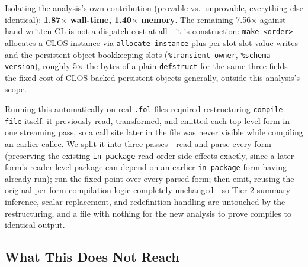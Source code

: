 \documentclass[sigplan,review,anonymous]{acmart}
\begin{document}
Isolating the analysis's own contribution (provable vs.\ unprovable, everything else identical): \textbf{1.87$\times$ wall-time, 1.40$\times$ memory}. The remaining 7.56$\times$ against hand-written CL is not a dispatch cost at all---it is construction: \texttt{make-<order>} allocates a CLOS instance via \texttt{allocate-instance} plus per-slot slot-value writes and the persistent-object bookkeeping slots (\texttt{\%transient-owner}, \texttt{\%schema-version}), roughly 5$\times$ the bytes of a plain \texttt{defstruct} for the same three fields---the fixed cost of CLOS-backed persistent objects generally, outside this analysis's scope.

Running this automatically on real \texttt{.fol} files required restructuring \texttt{compile-file} itself: it previously read, transformed, and emitted each top-level form in one streaming pass, so a call site later in the file was never visible while compiling an earlier callee. We split it into three passes---read and parse every form (preserving the existing \texttt{in-package} read-order side effects exactly, since a later form's reader-level package can depend on an earlier \texttt{in-package} form having already run); run the fixed point over every parsed form; then emit, reusing the original per-form compilation logic completely unchanged---so Tier-2 summary inference, scalar replacement, and redefinition handling are untouched by the restructuring, and a file with nothing for the new analysis to prove compiles to identical output.

\subsection{What This Does Not Reach}
\label{sec:interp-limits}
\end{document}
